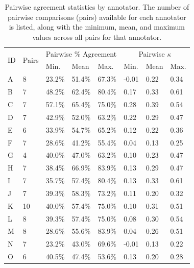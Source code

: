 		
		\begin{table}[p]
			\centering
			\caption[Pairwise agreement statistics by annotator]{Pairwise agreement statistics by annotator. The number of pairwise comparisons (pairs) available for each annotator is listed, along with the minimum, mean, and maximum values across all pairs for that annotator.}
			
			\begin{tabularx}{\textwidth}{XXXXXXXX}			
			\toprule

\multirow{2}{*}{ID}	&	\multirow{2}{*}{Pairs}	&	\multicolumn{3}{c}{Pairwise \% Agreement}					&	\multicolumn{3}{c}{Pairwise $\kappa$}					\\
				\cmidrule(lr){3-5}						\cmidrule(lr){6-8}					
	&		&	Min.	&	Mean	&	Max.	&	Min.	&	Mean&	Max.	\\
\midrule															
A	&	8	&	23.2\%	&	51.4\%	&	67.3\%	&	-0.01	&	0.22	&	0.34	\\
B	&	7	&	48.2\%	&	62.4\%	&	80.4\%	&	0.17	&	0.33	&	0.61	\\
C	&	7	&	57.1\%	&	65.4\%	&	75.0\%	&	0.28	&	0.39	&	0.54	\\
D	&	7	&	42.9\%	&	52.0\%	&	63.2\%	&	0.22	&	0.29	&	0.47	\\
E	&	6	&	33.9\%	&	54.7\%	&	65.2\%	&	0.12	&	0.22	&	0.36	\\
F	&	7	&	28.6\%	&	41.2\%	&	55.4\%	&	0.04	&	0.13	&	0.25	\\
G	&	4	&	40.0\%	&	47.0\%	&	63.2\%	&	0.10	&	0.23	&	0.47	\\
H	&	7	&	38.4\%	&	66.9\%	&	83.9\%	&	0.13	&	0.29	&	0.47	\\
I	&	7	&	35.7\%	&	57.4\%	&	80.4\%	&	0.13	&	0.33	&	0.61	\\
J	&	7	&	39.3\%	&	58.3\%	&	73.2\%	&	0.11	&	0.20	&	0.32	\\
K	&	10	&	40.0\%	&	57.4\%	&	75.0\%	&	0.10	&	0.31	&	0.51	\\
L	&	8	&	39.3\%	&	57.4\%	&	75.0\%	&	0.08	&	0.30	&	0.54	\\
M	&	8	&	28.6\%	&	55.6\%	&	83.9\%	&	0.04	&	0.26	&	0.51	\\
N	&	7	&	23.2\%	&	43.0\%	&	69.6\%	&	-0.01	&	0.13	&	0.22	\\
O	&	6	&	40.5\%	&	47.4\%	&	53.6\%	&	0.13	&	0.20	&	0.28	\\		
			
			\bottomrule
			\end{tabularx}
			
			\label{tab:agreement:annotators}
		\end{table}
		
